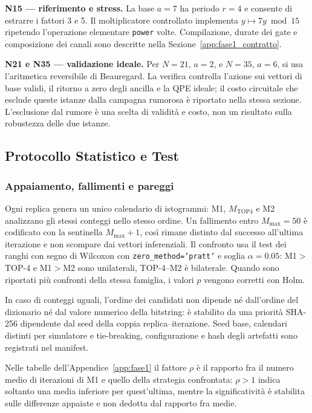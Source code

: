 \begin{onehalfspace}
\textbf{N15 --- riferimento e stress.} La base $a=7$ ha periodo $r=4$ e consente di estrarre i fattori 3 e 5. Il moltiplicatore controllato implementa $y\mapsto7y\bmod15$ ripetendo l'operazione elementare \texttt{power} volte. Compilazione, durate dei gate e composizione dei canali sono descritte nella Sezione~\ref{app:fase1_contratto}.

\textbf{N21 e N35 --- validazione ideale.} Per $N=21$, $a=2$, e $N=35$, $a=6$, si usa l'aritmetica reversibile di Beauregard. La verifica controlla l'azione sui vettori di base validi, il ritorno a zero degli ancilla e la QPE ideale; il costo circuitale che esclude queste istanze dalla campagna rumorosa è riportato nella stessa sezione. L'esclusione dal rumore è una scelta di validità e costo, non un risultato sulla robustezza delle due istanze.

\subsection{Protocollo Statistico e Test}
\label{app:obiettivi:protocollo}

\subsubsection{Appaiamento, fallimenti e pareggi}

Ogni replica genera un unico calendario di istogrammi: M1, $M_{\mathrm{TOP4}}$ e M2 analizzano gli stessi conteggi nello stesso ordine. Un fallimento entro $M_{\max}=50$ è codificato con la sentinella $M_{\max}+1$, così rimane distinto dal successo all'ultima iterazione e non scompare dai vettori inferenziali. Il confronto usa il test dei ranghi con segno di Wilcoxon con \texttt{zero\_method='pratt'} e soglia $\alpha=0.05$: M1$>$TOP-4 e M1$>$M2 sono unilaterali, TOP-4--M2 è bilaterale. Quando sono riportati più confronti della stessa famiglia, i valori $p$ vengono corretti con Holm.

In caso di conteggi uguali, l'ordine dei candidati non dipende né dall'ordine del dizionario né dal valore numerico della bitstring: è stabilito da una priorità SHA-256 dipendente dal seed della coppia replica--iterazione. Seed base, calendari distinti per simulatore e tie-breaking, configurazione e hash degli artefatti sono registrati nel manifest.

Nelle tabelle dell'Appendice~\ref{app:fase1} il fattore $\rho$ è il rapporto fra il numero medio di iterazioni di M1 e quello della strategia confrontata: $\rho>1$ indica soltanto una media inferiore per quest'ultima, mentre la significatività è stabilita sulle differenze appaiate e non dedotta dal rapporto fra medie.


\end{onehalfspace}
